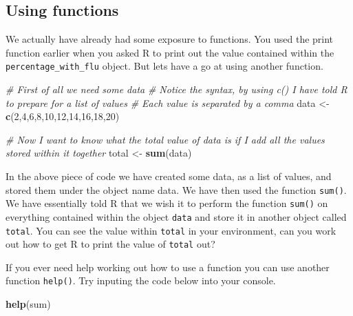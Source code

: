 \documentclass[
]{book}
\newenvironment{Shaded}{\begin{snugshade}}{\end{snugshade}}
\newcommand{\CommentTok}[1]{\textcolor[rgb]{0.56,0.35,0.01}{\textit{#1}}}
\newcommand{\DecValTok}[1]{\textcolor[rgb]{0.00,0.00,0.81}{#1}}
\newcommand{\FunctionTok}[1]{\textcolor[rgb]{0.13,0.29,0.53}{\textbf{#1}}}
\newcommand{\NormalTok}[1]{#1}
\newcommand{\OtherTok}[1]{\textcolor[rgb]{0.56,0.35,0.01}{#1}}
\begin{document}
\hypertarget{using-functions}{%
\subsection{Using functions}\label{using-functions}}

We actually have already had some exposure to functions. You used the print function earlier when you asked R to print out the value contained within the \texttt{percentage\_with\_flu} object. But lets have a go at using another function.

\begin{Shaded}
\begin{Highlighting}[]
\CommentTok{\# First of all we need some data}
\CommentTok{\# Notice the syntax, by using c() I have told R to prepare for a list of values}
\CommentTok{\# Each value is separated by a comma}
\NormalTok{data }\OtherTok{\textless{}{-}} \FunctionTok{c}\NormalTok{(}\DecValTok{2}\NormalTok{,}\DecValTok{4}\NormalTok{,}\DecValTok{6}\NormalTok{,}\DecValTok{8}\NormalTok{,}\DecValTok{10}\NormalTok{,}\DecValTok{12}\NormalTok{,}\DecValTok{14}\NormalTok{,}\DecValTok{16}\NormalTok{,}\DecValTok{18}\NormalTok{,}\DecValTok{20}\NormalTok{)}

\CommentTok{\# Now I want to know what the total value of data is if I add all the values stored within it together}
\NormalTok{total }\OtherTok{\textless{}{-}} \FunctionTok{sum}\NormalTok{(data)}
\end{Highlighting}
\end{Shaded}

In the above piece of code we have created some data, as a list of values, and stored them under the object name data. We have then used the function \texttt{sum()}. We have essentially told R that we wish it to perform the function \texttt{sum()} on everything contained within the object \texttt{data} and store it in another object called \texttt{total}. You can see the value within \texttt{total} in your environment, can you work out how to get R to print the value of \texttt{total} out?

If you ever need help working out how to use a function you can use another function \texttt{help()}. Try inputing the code below into your console.

\begin{Shaded}
\begin{Highlighting}[]
\FunctionTok{help}\NormalTok{(sum)}
\end{Highlighting}
\end{Shaded}
\end{document}
